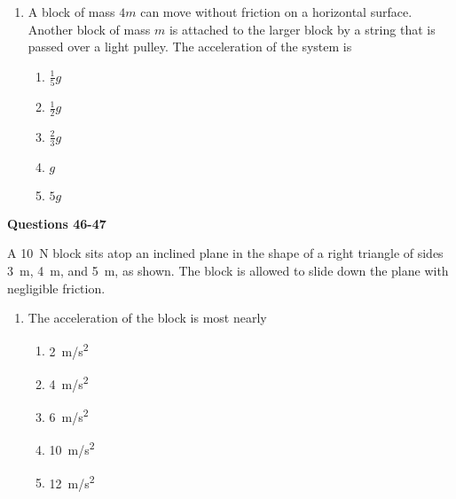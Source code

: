\documentclass{../../oss-apphys}
\begin{document}
\begin{multicols}{2}
\begin{enumerate}[resume,leftmargin=18pt]
  \item A block of mass $4m$ can move without friction on a horizontal surface.
    Another block of mass $m$ is attached to the larger block by a string that
    is passed over a light pulley. The acceleration of the system is

    \vspace{-.2in}
    \begin{enumerate}[noitemsep,topsep=0pt,leftmargin=18pt,label=(\Alph*)]
    \item $\displaystyle\frac{1}{5} g$
    \item $\displaystyle\frac{1}{2} g$
    \item $\displaystyle\frac{2}{3} g$
    \item $g$
    \item $5g$
    \end{enumerate}

  \end{enumerate}
  
  \textbf{Questions 46-47}

  A \SI{10}{\newton} block sits atop an inclined plane in the shape of a
  right triangle of sides \SI{3}{\metre}, \SI{4}{\metre}, and \SI{5}{\metre},
  as shown. The block is allowed to slide down the plane with negligible
  friction.
  \vspace{-.2in}
  
  \begin{enumerate}[resume,leftmargin=18pt]
  \item The acceleration of the block is most nearly
    \begin{enumerate}[noitemsep,topsep=0pt,leftmargin=18pt,label=(\Alph*)]
    \item\SI{2}{m/s^2}
    \item\SI{4}{m/s^2}
    \item\SI{6}{m/s^2}
    \item\SI{10}{m/s^2}
    \item\SI{12}{m/s^2}
    \end{enumerate}


\end{enumerate}
\end{multicols}
\end{document}

